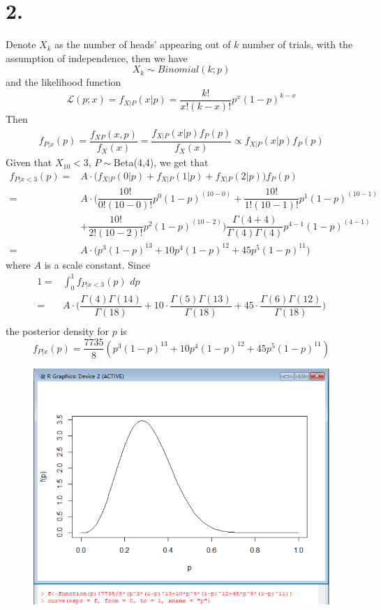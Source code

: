 \documentclass[a4paper,12pt,titlepage]{article}
\begin{document}
\section*{2.}
Denote $X_k$ as the number of heads' appearing out of $k$ number of trials, with the assumption of independence, then we have
$$X_k\sim Binomial (k; p)$$
and the likelihood function
$$\mathcal{L}(p; x) = f_{X|P} (x | p) =\dfrac{k!}{x!(k-x)!}p^x(1-p)^{k-x}$$
Then
\begin{align*}
    f_{P|x}(p)=\dfrac{f_{XP}(x,p)}{f_{X}(x)}=\dfrac{f_{X|P}(x|p)f_P(p)}{f_X(x)}\propto f_{X|P}(x|p)f_P(p)
\end{align*}
Given that $X_{10}<3$, $P\sim$Beta(4,4), we get that
\begin{align*}
    f_{P|x<3}(p)=&A\cdot\Big(f_{X|P}(0|p)+f_{X|P}(1|p)+f_{X|P}(2|p)\Big)f_{P}(p)\\
    =&A\cdot\Big(\dfrac{10!}{0!(10-0)!}p^0(1-p)^{(10-0)}+\dfrac{10!}{1!(10-1)!}p^1(1-p)^{(10-1)}\\
    &+\dfrac{10!}{2!(10-2)!}p^2(1-p)^{(10-2)}\Big)\dfrac{\Gamma(4+4)}{\Gamma(4)\Gamma(4)}p^{4-1}(1-p)^{(4-1)}\\
    =&A\cdot\Big(p^3(1-p)^{13}+10p^4(1-p)^{12}+45p^5(1-p)^{11}\Big)
\end{align*}
where $A$ is a scale constant. Since
\begin{align*}
    1=&\int_{0}^{1}f_{P|x<3}(p)\,\,dp\\
    =&A\cdot\Big(\dfrac{\Gamma(4)\Gamma(14)}{\Gamma(18)}+10\cdot\dfrac{\Gamma(5)\Gamma(13)}{\Gamma(18)}+45\cdot\dfrac{\Gamma(6)\Gamma(12)}{\Gamma(18)}\Big)\\
\end{align*}
the posterior density for $p$ is 
$$f_{P|x}(p)=\dfrac{7735}{8}(p^3(1-p)^{13}+10p^4(1-p)^{12}+45p^5(1-p)^{11})$$
\begin{figure}[H]
    \centering
    \includegraphics[scale=0.8]{2.PNG}
\end{figure}
\end{document}
